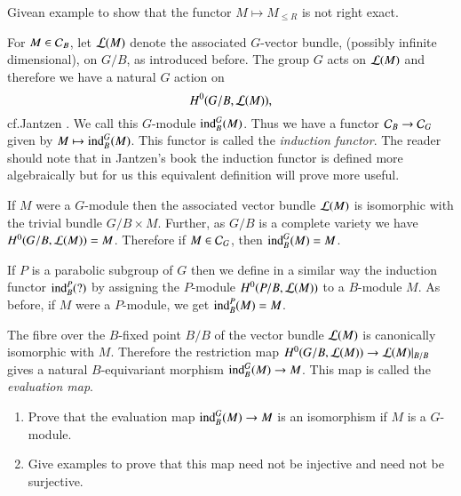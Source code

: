 \begin{exercise}\label{chap2-exer2.1.1}
Give\pageoriginale an example to show that the functor $M\mapsto
M_{\leq R}$ is not right exact.
\end{exercise}

\label{page11}
For $M\in \mathcal{C}_{B}$, let $\mathcal{L}(M)$ denote the associated $G$-vector
bundle, (possibly infinite dimensional), on $G/B$, as introduced
before. The group $G$ acts on $\mathcal{L}(M)$ and therefore we have a natural
$G$ action on 
$$
H^{0}(G/B,\mathcal{L}(M)),
$$ 
cf.\@ Jantzen \cite[I 5.11
  Remark]{key11}. We call this $G$-module $\operatorname{ind}^{G}_{B}(M)$. Thus we
have a functor $\mathcal{C}_{B}\to \mathcal{C}_{G}$ given by $M\mapsto
\operatorname{ind}^{G}_{B}(M)$. This functor is called the {\em induction
  functor}. The reader should note that in
Jantzen's book the 
induction functor is defined more algebraically but for us this
equivalent definition will prove more useful.

If $M$ were a $G$-module then the associated vector bundle $\mathcal{L}(M)$ is
isomorphic with the trivial bundle $G/B\times M$. Further, as $G/B$ is
a complete variety we have $H^{0}(G/B,\mathcal{L}(M))=M$. Therefore if $M\in
\mathcal{C}_{G}$, then $\operatorname{ind}^{G}_{B}(M)=M$.

\begin{remark}\label{chap2-rem2.1.2}
If $P$ is a parabolic subgroup of $G$ then we define in a similar way
the induction functor $\operatorname{ind}^{P}_{B}(?)$ by assigning the $P$-module
$H^{0}(P/B,\mathcal{L}(M))$ to a $B$-module $M$. As before, if $M$ were a
$P$-module, we get $\operatorname{ind}^{P}_{B}(M)=M$.
\end{remark}

\begin{remark}\label{chap2-rem2.1.3}
The fibre over the $B$-fixed point $B/B$ of the vector bundle $\mathcal{L}(M)$
is canonically isomorphic with $M$. Therefore the restriction map
$H^{0}(G/B,\mathcal{L}(M))\to \mathcal{L}(M)|_{B/B}$ gives a natural $B$-equivariant
morphism $\operatorname{ind}^{G}_{B}(M)\to M$. This map is called the {\em
  evaluation map}.
\end{remark}

\begin{exercise}\label{chap2-exer2.1.4}
\begin{enumerate}
\renewcommand{\theenumi}{\roman{enumi}}
\renewcommand{\labelenumi}{(\theenumi)}
\item Prove that the evaluation map $\operatorname{ind}^{G}_{B}(M)\to M$ is an
  isomorphism if $M$ is a $G$-module.

\item Give examples to prove that this map need not be injective and
  need not be surjective.
\end{enumerate}
\end{exercise}

